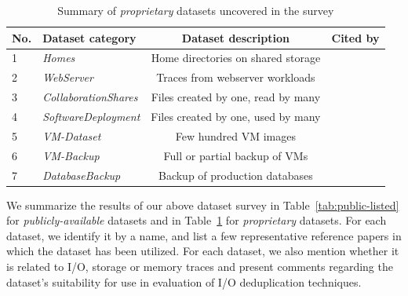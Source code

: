 \begin{table} [t]
	\begin{tabular}{|l|l|c|l|} \hline
		\textbf{No.} & \textbf{Dataset category} & \textbf{Dataset description} & \textbf{Cited by} \\ \hline
1 & \textit{Homes} & Home directories on shared storage & \cite{primary-data-dedup, backup-workloads-characterization, datadomain, cifs-study, redundancy-alternatives} \\ 
2 & \textit{WebServer} & Traces from webserver workloads & \cite{filesystem-workloads, content-sampling, web-cable-modem, scaling-phenomena, web-client-access-patterns} \\
3 & \textit{CollaborationShares} & Files created by one, read by many & \cite{idedup, cifs-study, redundancy-alternatives, content-sampling} \\
4 & \textit{SoftwareDeployment} & Files created by one, used by many & \cite{idedup, primary-data-dedup, redundancy-alternatives} \\
5 & \textit{VM-Dataset} & Few hundred VM images & \cite{similarity, vdn, primary-data-dedup, dedup-effectiveness, building-highperf-dedup} \\
6 & \textit{VM-Backup} & Full or partial backup of VMs& \cite{ddelta, vmdk-backups, hysteresis-rechunking, lowcost-dedup-for-backup} \\
7 & \textit{DatabaseBackup} & Backup of production databases & \cite{ddelta, backup-workloads-characterization, hybrid-dedup, ventana} \\ \hline
	\end{tabular}
	\caption{Summary of \textit{proprietary} datasets uncovered in the survey}
	\label{tab:proprietary-listed}
\end{table}

We summarize the results of our above dataset survey in 
Table~\ref{tab:public-listed} for \textit{publicly-available} datasets
and in Table~\ref{tab:proprietary-listed} for \textit{proprietary} datasets. 
For each dataset, we identify 
it by a name, and list a few representative reference
papers in which the dataset has been utilized. For each dataset,
we also mention whether it is related to I/O, storage
or memory traces and present comments regarding the dataset's
suitability for use in evaluation of I/O deduplication techniques.

